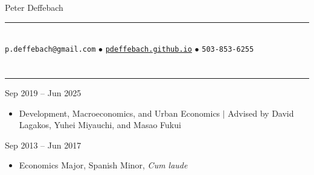 \documentclass[10pt]{article}
\newenvironment{customitemize}
{ \begin{itemize}[leftmargin=\parindent, topsep = 0.2pt, itemsep = -3pt] }
{\end{itemize} }
\begin{document}
\normalsize
\singlespacing
\thispagestyle{empty}

\begin{center}
{\Large \sc Peter Deffebach} \\ 
\vspace{-5pt}
\rule{3in}{1pt} \\
\texttt{p.deffebach@gmail.com} $\bullet$ \href{https://pdeffebach.github.io/}{\texttt{pdeffebach.github.io}} $\bullet$ \texttt{503-853-6255}  \\
\end{center} 

\vspace{-12pt}
\section*{}
\noindent \rule{\textwidth}{1pt} 
  \hfill Sep 2019 -- Jun 2025
\begin{customitemize}
	\item Development, Macroeconomics, and Urban Economics $\big |$ Advised by David Lagakos, Yuhei Miyauchi, and Masao Fukui
\end{customitemize}
  \hfill Sep 2013 -- Jun 2017
\begin{customitemize}
	\item Economics Major, Spanish Minor, \textit{Cum laude}
\end{customitemize}
\end{document}
